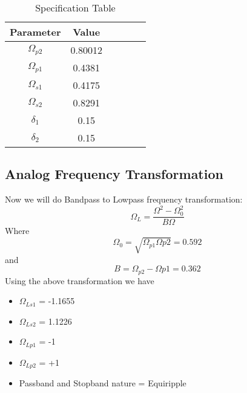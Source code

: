 \documentclass[12pt]{article}
\begin{document}
\begin{table}[!hbt]
		\begin{center}
		\caption{Specification Table}
		\begin{tabular}{|c|c|c|c|c|c|}
			\hline
			  Parameter & Value \\
			\hline
			 $\Omega_{p2}$& 0.80012\\
			\hline
			 $\Omega_{p1}$ & 0.4381\\
			\hline
			 $\Omega_{s1}$ & 0.4175\\
			\hline
		     $\Omega_{s2}$ & 0.8291\\
			\hline
		    $\delta_1$ & 0.15\\
		    \hline
		    $\delta_2$ & 0.15\\
		    \hline
		\end{tabular}
		\end{center}
\end{table}

\subsection{\textbf{Analog Frequency Transformation}}
Now we will do Bandpass to Lowpass frequency transformation:\\
\begin{equation*}
    \Omega_L = \frac{\Omega^2-\Omega_0^2}{B\Omega}
\end{equation*}
Where \\
\begin{equation*}
    \Omega_0 = \sqrt{\Omega_{p1}\Omega{p2}} = 0.592
\end{equation*}
and\\
\begin{equation*}
    B = \Omega_{p2}-\Omega{p1} = 0.362
\end{equation*}
Using the above transformation we have\\
\begin{itemize}
    \item $\Omega_{Ls1}$ = -1.1655
    \item $\Omega_{Ls2}$ = 1.1226
    \item $\Omega_{Lp1}$ = -1
    \item $\Omega_{Lp2}$ = +1
    \item Passband and Stopband nature = Equiripple
\end{itemize}
\end{document}
